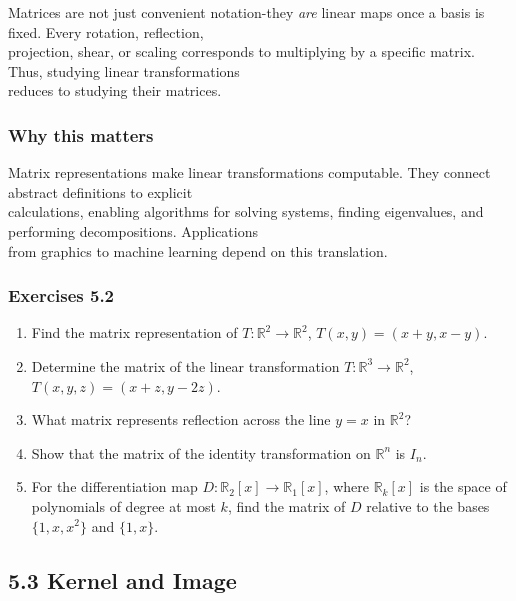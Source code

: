 \documentclass[
  12pt,
  a4paper,
]{article}
\begin{document}
Matrices are not just convenient notation-they \emph{are} linear maps
once a basis is fixed. Every rotation, reflection,\\
projection, shear, or scaling corresponds to multiplying by a specific
matrix. Thus, studying linear transformations\\
reduces to studying their matrices.

\subsubsection{Why this matters}\label{why-this-matters-17}

Matrix representations make linear transformations computable. They
connect abstract definitions to explicit\\
calculations, enabling algorithms for solving systems, finding
eigenvalues, and performing decompositions. Applications\\
from graphics to machine learning depend on this translation.

\subsubsection{Exercises 5.2}\label{exercises-52}

\begin{enumerate}
\def\labelenumi{\arabic{enumi}.}
\item
  Find the matrix representation of \(T:\mathbb{R}^2 \to \mathbb{R}^2\),
  \(T(x,y) = (x+y, x-y)\).
\item
  Determine the matrix of the linear transformation
  \(T:\mathbb{R}^3 \to \mathbb{R}^2\), \(T(x,y,z) = (x+z, y-2z)\).
\item
  What matrix represents reflection across the line \(y=x\) in
  \(\mathbb{R}^2\)?
\item
  Show that the matrix of the identity transformation on
  \(\mathbb{R}^n\) is \(I_n\).
\item
  For the differentiation map \(D:\mathbb{R}_2[x] \to \mathbb{R}_1[x]\),
  where \(\mathbb{R}_k[x]\) is the space of\\
  polynomials of degree at most \(k\), find the matrix of \(D\) relative
  to the bases \(\{1,x,x^2\}\) and \(\{1,x\}\).
\end{enumerate}

\subsection{5.3 Kernel and Image}\label{53-kernel-and-image}
\end{document}
